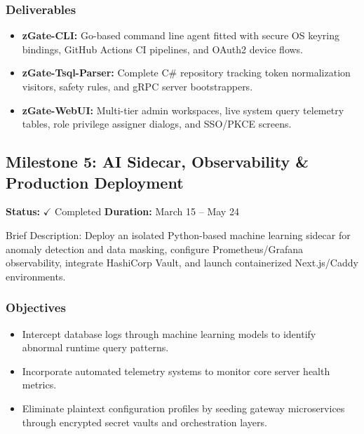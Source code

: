 \subsubsection{Deliverables}
\begin{itemize}
    \item \textbf{zGate-CLI:} Go-based command line agent fitted with secure OS keyring bindings, GitHub Actions CI pipelines, and OAuth2 device flows.
    \item \textbf{zGate-Tsql-Parser:} Complete C\# repository tracking token normalization visitors, safety rules, and gRPC server bootstrappers.
    \item \textbf{zGate-WebUI:} Multi-tier admin workspaces, live system query telemetry tables, role privilege assigner dialogs, and SSO/PKCE screens.
\end{itemize}


\subsection{Milestone 5: AI Sidecar, Observability \& Production Deployment}
\textbf{Status:} $\checkmark$ Completed \hfill \textbf{Duration:} March 15 -- May 24

Brief Description: Deploy an isolated Python-based machine learning sidecar for anomaly detection and data masking, configure Prometheus/Grafana observability, integrate HashiCorp Vault, and launch containerized Next.js/Caddy environments.

\subsubsection{Objectives}
\begin{itemize}
    \item Intercept database logs through machine learning models to identify abnormal runtime query patterns.
    \item Incorporate automated telemetry systems to monitor core server health metrics.
    \item Eliminate plaintext configuration profiles by seeding gateway microservices through encrypted secret vaults and orchestration layers.
\end{itemize}


